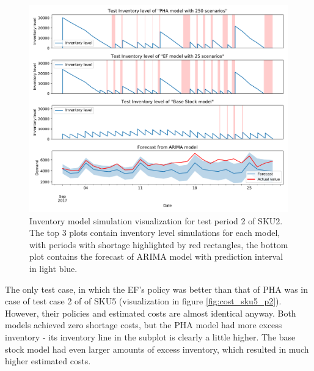 \documentclass[11pt,a4paper]{article}
\begin{document}
\begin{figure}
  \includegraphics[width=1\linewidth]{figures/cost_sku2_2.pdf}
  \caption[Inventory model simulation visualization for test period 2 of SKU2]{Inventory model simulation visualization for test period 2 of SKU2. The top 3 plots contain inventory level simulations for each model, with periods with shortage highlighted by red rectangles, the bottom plot contains the forecast of ARIMA model with prediction interval in light blue.}
  \label{fig:cost_sku2_p2}
\end{figure}



\newpage

The only test case, in which the EF's policy was better than that of PHA  was in case of test case 2 of of SKU5 (visualization in figure \ref{fig:cost_sku5_p2}). However, their policies and estimated costs are almost identical anyway. Both models achieved zero shortage costs, but the PHA model had more excess inventory - its inventory line in the subplot is clearly a little higher. The base stock model had even larger amounts of excess inventory, which resulted in much higher estimated costs.
\end{document}
